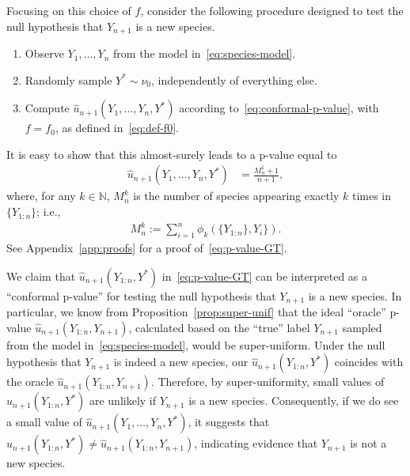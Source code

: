 \documentclass[11pt]{article}
\begin{document}
Focusing on this choice of $f$, consider the following procedure designed to test the null hypothesis that $Y_{n+1}$ is a new species.
\begin{enumerate}
\item Observe $Y_1, \ldots, Y_n$ from the model in~\eqref{eq:species-model}.
\item Randomly sample $Y^* \sim \nu_0$, independently of everything else.
\item Compute $\hat{u}_{n+1}(Y_1, \ldots, Y_n, Y^*)$ according to~\eqref{eq:conformal-p-value}, with $f=f_0$, as defined in~\eqref{eq:def-f0}.
\end{enumerate}
It is easy to show that this almost-surely leads to a p-value equal to
\begin{align} \label{eq:p-value-GT}
  \hat{u}_{n+1}(Y_1,\ldots,Y_{n},Y^*)
  & = \frac{M_n^1+1}{n+1},
\end{align}
where, for any $k \in \mathbb{N}$, $M_n^k$ is the number of species appearing exactly $k$ times in $\{Y_{1:n}\}$; i.e.,
\begin{align*}
  M_n^k := \sum_{i=1}^{n} \phi_k (\{Y_{1:n}\}, Y_{i}\}).
\end{align*}
See Appendix~\ref{app:proofs} for a proof of~\eqref{eq:p-value-GT}.


We claim that $\hat{u}_{n+1}(Y_{1:n}, Y^*)$ in~\eqref{eq:p-value-GT} can be interpreted as a ``conformal p-value'' for testing the null hypothesis that $Y_{n+1}$ is a new species.
In particular, we know from Proposition~\ref{prop:super-unif} that the ideal ``oracle'' p-value $\hat{u}_{n+1}(Y_{1:n},Y_{n+1})$, calculated based on the ``true'' label $Y_{n+1}$ sampled from the model in~\eqref{eq:species-model}, would be super-uniform. 
Under the null hypothesis that $Y_{n+1}$ is indeed a new species, our $\hat{u}_{n+1}(Y_{1:n}, Y^*)$ coincides with the oracle $\hat{u}_{n+1}(Y_{1:n}, Y_{n+1})$.
Therefore, by super-uniformity, small values of $\hat{u}_{n+1}(Y_{1:n}, Y^*)$ are unlikely if $Y_{n+1}$ is a new species.
Consequently, if we do see a small value of $\hat{u}_{n+1}(Y_1,\ldots,Y_{n},Y^*)$, it suggests that $\hat{u}_{n+1}(Y_{1:n}, Y^*) \neq \hat{u}_{n+1}(Y_{1:n}, Y_{n+1})$,  indicating evidence that $Y_{n+1}$ is not a new species.
\end{document}
